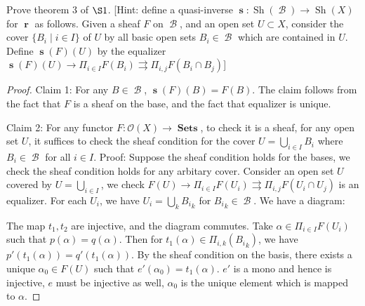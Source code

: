\documentclass[a4paper]{article}
\title{\hmwkTitle}
\author{\textbf{\hmwkAuthorName}}
\date{\hmwkDueDate}
\DeclareMathOperator{\Sets}{\mathbf {Sets}}
\DeclareMathOperator{\s}{\mathbf s}
\DeclareMathOperator{\rr}{\mathbf r}
\DeclareMathOperator{\Sh}{\text {Sh}}
\DeclareMathOperator{\B}{\mathcal B}
\begin{document}
\begin{titlepage}
    \maketitle
\end{titlepage}
\begin{question}
    Prove theorem 3 of $\S 1$. [Hint: define a quasi-inverse $\s: \Sh(\B)\to \Sh(X)$ for $\rr$ as follows. Given a sheaf $F$ on $\B$, and an open set $U\subset X$, consider the cover $\{B_i\mid i\in I\}$ of $U$ by all basic open sets $B_i\in\B$ which are contained in $U$. Define $\s(F)(U)$ by the equalizer
    $ \s(F)(U)\to\Pi_{i\in I}F(B_i)\rightrightarrows\Pi_{i,j}F(B_i\cap B_j)$]
\end{question}
\begin{proof}
Claim 1: For any $B\in \B$, $\s(F)(B)=F(B)$.\newline
The claim follows from the fact that $F$ is a sheaf on the base, and the fact that equalizer is unique.

Claim 2: For any functor $F:{\mathcal O}(X)\to \Sets$, to check it is a sheaf, for any open set $U$, it suffices to check the sheaf condition for the cover $U=\bigcup_{i\in I}B_i$ where $B_i\in \B$ for all $i\in I$.\newline
Proof: Suppose the sheaf condition holds for the bases, we check the sheaf condition holds for any arbitary cover. Consider an open set $U$ covered by $U=\bigcup_{i\in I}$, we check $ F(U)\to\Pi_{i\in I}F(U_i)\rightrightarrows\Pi_{i,j}F(U_i\cap U_j)$ is an equalizer. For each $U_i$, we have $U_i=\bigcup_k {B_i}_k$ for ${B_i}_k\in \B$. We have a diagram:

\begin{center}
\end{center}

The map $t_1,t_2$ are injective, and the diagram commutes. Take $\alpha\in \Pi_{i\in I}F(U_i)$ such that $p(\alpha)=q(\alpha)$. Then for $t_1(\alpha)\in \Pi_{i,k}({B_i}_k)$, we have $p'(t_1(\alpha))=q'(t_1(\alpha))$. By the sheaf condition on the basis, there exists a unique $\alpha_0\in F(U)$ such that $e'(\alpha_0) = t_1(\alpha)$. $e'$ is a mono and hence is injective, $e$ must be injective as well, $\alpha_0$ is the unique element which is mapped to $\alpha$. 


\end{proof}
\end{document}
